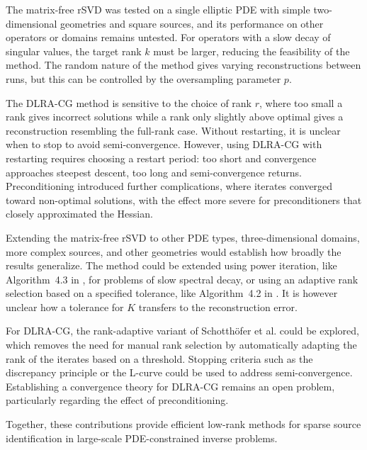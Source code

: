 The matrix-free rSVD was tested on a single elliptic PDE with simple two-dimensional geometries and square sources, and its performance on other operators or domains remains untested. For operators with a slow decay of singular values, the target rank $k$ must be larger, reducing the feasibility of the method. The random nature of the method gives varying reconstructions between runs, but this can be controlled by the oversampling parameter $p$.

The DLRA-CG method is sensitive to the choice of rank $r$, where too small a rank gives incorrect solutions while a rank only slightly above optimal gives a reconstruction resembling the full-rank case. Without restarting, it is unclear when to stop to avoid semi-convergence. However, using DLRA-CG with restarting requires choosing a restart period: too short and convergence approaches steepest descent, too long and semi-convergence returns. Preconditioning introduced further complications, where iterates converged toward non-optimal solutions, with the effect more severe for preconditioners that closely approximated the Hessian.

Extending the matrix-free rSVD to other PDE types, three-dimensional domains, more complex sources, and other geometries would establish how broadly the results generalize. The method could be extended using power iteration, like Algorithm~4.3 in \cite{halkoFindingStructureRandomness2011}, for problems of slow spectral decay, or using an adaptive rank selection based on a specified tolerance, like Algorithm~4.2 in \cite{halkoFindingStructureRandomness2011}. It is however unclear how a tolerance for $K$ transfers to the reconstruction error.

For DLRA-CG, the rank-adaptive variant of Schotthöfer et al. \cite{schotthoferLowrankLotteryTickets2022} could be explored, which removes the need for manual rank selection by automatically adapting the rank of the iterates based on a threshold. Stopping criteria such as the discrepancy principle or the L-curve \cite{hansen2010discrete} could be used to address semi-convergence. Establishing a convergence theory for DLRA-CG remains an open problem, particularly regarding the effect of preconditioning.

Together, these contributions provide efficient low-rank methods for sparse source identification in large-scale PDE-constrained inverse problems.